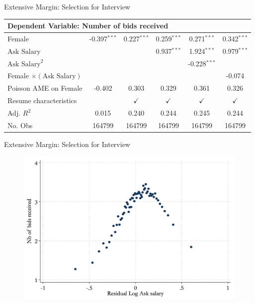 \begin{frame}{Extensive Margin: Selection for Interview}
    \begin{table}[h!]
        \scriptsize
        \begin{center}
            \begin{tabular}{lccccc}
                \multicolumn{6}{l}{Dependent Variable: \textcolor{frenchlilac!45!white}{Number of bids received}} \\
                \hline
                Female & {-0.397$^{***}$} & \textcolor{frenchlilac!45!white}{0.227$^{***}$} & \textcolor{frenchlilac!45!white}{0.259$^{***}$} & \textcolor{frenchlilac!45!white}{0.271$^{***}$} & \textcolor{frenchlilac!45!white}{0.342$^{***}$}\\
                $\text{Ask Salary}$ & & & {0.937$^{***}$} & {1.924$^{***}$} & {0.979$^{***}$} \\
                $\text{Ask Salary}^2$ & & & & {-0.228$^{***}$} &  \\
                Female $\times (\text{Ask Salary})$  & & & & &  {-0.074}\\
                \hline 
                Poisson AME on Female & -0.402 & 0.303 & 0.329 & 0.361 & 0.326 \\
                Resume characteristics & & $\checkmark$ & $\checkmark$ & $\checkmark$& $\checkmark$\\
                Adj. $R^2$ & 0.015 & 0.240 & 0.244 & 0.245 & 0.244 \\
                No. Obs & 164799 & 164799 & 164799 & 164799 & 164799 
            \end{tabular}
        \end{center}
    \end{table}
\end{frame}

\begin{frame}{Extensive Margin: Selection for Interview}
    \begin{figure}
        \centering
        \includegraphics[height = 0.7 \textheight]{images/ask_nobids.png}
    \end{figure}
\end{frame}

